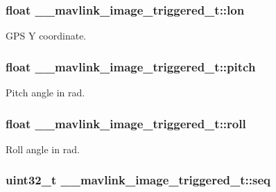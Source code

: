\hypertarget{struct____mavlink__image__triggered__t_a52e7b9a9367c72d7ce75dd4cd8e2163a}{
\subsubsection[{lon}]{\setlength{\rightskip}{0pt plus 5cm}float \+\_\+\+\_\+mavlink\+\_\+image\+\_\+triggered\+\_\+t\+::lon}}\label{struct____mavlink__image__triggered__t_a52e7b9a9367c72d7ce75dd4cd8e2163a}


G\+P\+S Y coordinate. 

\hypertarget{struct____mavlink__image__triggered__t_a226476112557c85a69e8c212ebab2864}{
\subsubsection[{pitch}]{\setlength{\rightskip}{0pt plus 5cm}float \+\_\+\+\_\+mavlink\+\_\+image\+\_\+triggered\+\_\+t\+::pitch}}\label{struct____mavlink__image__triggered__t_a226476112557c85a69e8c212ebab2864}


Pitch angle in rad. 

\hypertarget{struct____mavlink__image__triggered__t_a6f55938269455fcd88372e4c84b4c5dd}{
\subsubsection[{roll}]{\setlength{\rightskip}{0pt plus 5cm}float \+\_\+\+\_\+mavlink\+\_\+image\+\_\+triggered\+\_\+t\+::roll}}\label{struct____mavlink__image__triggered__t_a6f55938269455fcd88372e4c84b4c5dd}


Roll angle in rad. 

\hypertarget{struct____mavlink__image__triggered__t_aad40e161ce4c73402422481914133978}{
\subsubsection[{seq}]{\setlength{\rightskip}{0pt plus 5cm}uint32\+\_\+t \+\_\+\+\_\+mavlink\+\_\+image\+\_\+triggered\+\_\+t\+::seq}}\label{struct____mavlink__image__triggered__t_aad40e161ce4c73402422481914133978}


